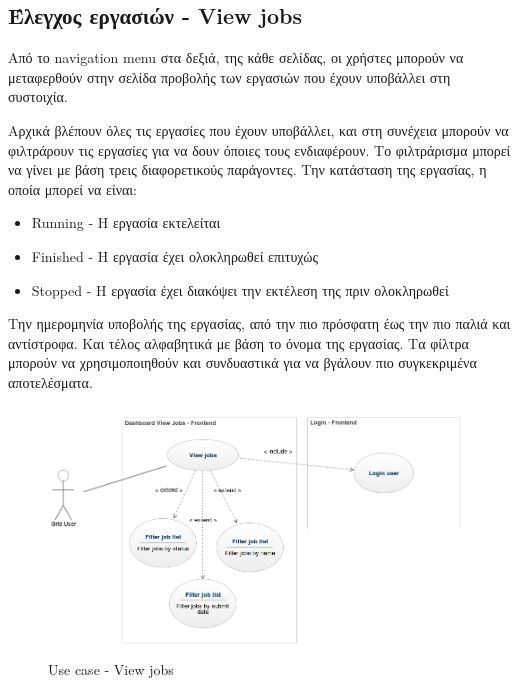 \subsection{Έλεγχος εργασιών - View jobs}

Από το navigation menu στα δεξιά, της κάθε σελίδας, οι χρήστες μπορούν να μεταφερθούν στην σελίδα προβολής των εργασιών που έχουν υποβάλλει στη συστοιχία.

Αρχικά βλέπουν όλες τις εργασίες που έχουν υποβάλλει, και στη συνέχεια μπορούν να φιλτράρουν τις εργασίες για να δουν όποιες τους ενδιαφέρουν.
\newline
Το φιλτράρισμα μπορεί να γίνει με βάση τρεις διαφορετικούς παράγοντες. 
\newline
Την κατάσταση της εργασίας, η οποία μπορεί να είναι:
\begin{itemize}
\item Running - Η εργασία εκτελείται
\item Finished - Η εργασία έχει ολοκληρωθεί επιτυχώς
\item Stopped - Η εργασία έχει διακόψει την εκτέλεση της πριν ολοκληρωθεί
\end{itemize}
Την ημερομηνία υποβολής της εργασίας, από την πιο πρόσφατη έως την πιο παλιά και αντίστροφα.
\newline
Και τέλος αλφαβητικά με βάση το όνομα της εργασίας.
\newline
Τα φίλτρα μπορούν να χρησιμοποιηθούν και συνδυαστικά για να βγάλουν πιο συγκεκριμένα αποτελέσματα.

\begin{figure}[bp!]
\caption{Use case - View jobs}
\includegraphics[width=16cm]{../images/view-jobs-case.png}
\centering
\end{figure}
\clearpage

